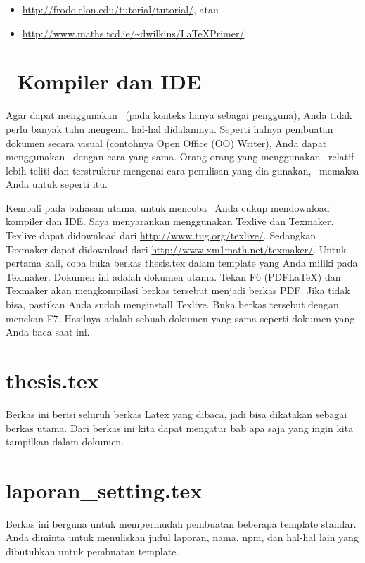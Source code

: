 \begin{itemize}
	\item \url{http://frodo.elon.edu/tutorial/tutorial/}, atau
	\item \url{http://www.maths.tcd.ie/~dwilkins/LaTeXPrimer/}
\end{itemize}


\section{\latex~Kompiler dan IDE}
Agar dapat menggunakan \latex~(pada konteks hanya sebagai pengguna), Anda 
tidak perlu banyak tahu mengenai hal-hal didalamnya. 
Seperti halnya pembuatan dokumen secara visual (contohnya Open Office (OO) 
Writer), Anda dapat menggunakan \latex~dengan cara yang sama. 
Orang-orang yang menggunakan \latex~relatif lebih teliti dan terstruktur 
mengenai cara penulisan yang dia gunakan, \latex~memaksa Anda untuk seperti 
itu.  

Kembali pada bahasan utama, untuk mencoba \latex~Anda cukup mendownload 
kompiler dan IDE. Saya menyarankan menggunakan Texlive dan Texmaker. 
Texlive dapat didownload dari \url{http://www.tug.org/texlive/}. 
Sedangkan Texmaker dapat didownload dari 
\url{http://www.xm1math.net/texmaker/}. 
Untuk pertama kali, coba buka berkas thesis.tex dalam template yang Anda miliki 
pada Texmaker. 
Dokumen ini adalah dokumen utama. 
Tekan F6 (PDFLaTeX) dan Texmaker akan mengkompilasi berkas tersebut menjadi 
berkas PDF. 
Jika tidak bisa, pastikan Anda sudah menginstall Texlive. 
Buka berkas tersebut dengan menekan F7. 
Hasilnya adalah sebuah dokumen yang sama seperti dokumen yang Anda baca saat 
ini. 

\section{thesis.tex}
Berkas ini berisi seluruh berkas Latex yang dibaca, jadi bisa dikatakan sebagai 
berkas utama. Dari berkas ini kita dapat mengatur bab apa saja yang ingin 
kita tampilkan dalam dokumen.


\section{laporan\_setting.tex}
Berkas ini berguna untuk mempermudah pembuatan beberapa template standar. 
Anda diminta untuk menuliskan judul laporan, nama, npm, dan hal-hal lain yang 
dibutuhkan untuk pembuatan template. 


